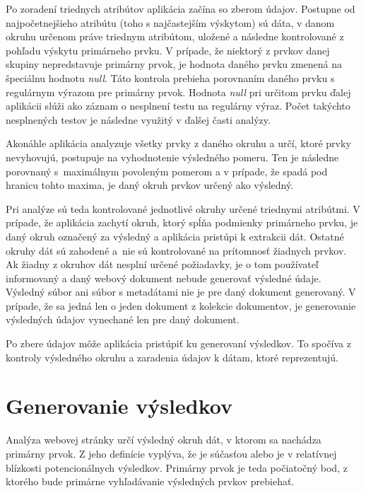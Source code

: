 Po zoradení triednych atribútov aplikácia začína so zberom údajov. Postupne od najpočetnejšieho atribútu (toho s najčastejším výskytom) sú dáta, v danom okruhu určenom práve triednym atribútom, uložené a následne kontrolované z pohľadu výskytu primárneho prvku. V prípade, že niektorý z prvkov danej skupiny nepredstavuje primárny prvok, je hodnota daného prvku zmenená na špeciálnu hodnotu \textit{null}. Táto kontrola prebieha porovnaním daného prvku s regulárnym výrazom pre primárny prvok. Hodnota \textit{null} pri určitom prvku ďalej aplikácii slúži ako záznam o nesplnení testu na regulárny výraz. Počet takýchto nesplnených testov je následne využitý v ďalšej časti analýzy.

Akonáhle aplikácia analyzuje všetky prvky z daného okruhu a určí, ktoré prvky nevyhovujú, postupuje na vyhodnotenie výsledného pomeru. Ten je následne porovnaný s~maximálnym povoleným pomerom a v prípade, že spadá pod hranicu tohto maxima, je daný okruh prvkov určený ako výsledný.

\bigskip

Pri analýze sú teda kontrolované jednotlivé okruhy určené triednymi atribútmi. V prípade, že aplikácia zachytí okruh, ktorý spĺňa podmienky primárneho prvku, je daný okruh označený za výsledný a aplikácia pristúpi k extrakcii dát. Ostatné okruhy dát sú zahodené a~nie sú kontrolované na prítomnosť žiadnych prvkov. Ak žiadny z okruhov dát nesplní určené požiadavky, je o tom používateľ informovaný a daný webový dokument nebude generovať výsledné údaje. Výsledný súbor ani súbor s metadátami nie je pre daný dokument generovaný. V prípade, že sa jedná len o jeden dokument z kolekcie dokumentov, je generovanie výsledných údajov vynechané len pre daný dokument.

Po zbere údajov môže aplikácia pristúpiť ku generovaní výsledkov. To spočíva z kontroly výsledného okruhu a zaradenia údajov k dátam, ktoré reprezentujú.

\newpage

\section{Generovanie výsledkov}

Analýza webovej stránky určí výsledný okruh dát, v ktorom sa nachádza primárny prvok. Z jeho definície vyplýva, že je súčasťou alebo je v relatívnej blízkosti potencionálnych výsledkov. Primárny prvok je teda počiatočný bod, z ktorého bude primárne vyhľadávanie výsledných prvkov prebiehať. 

